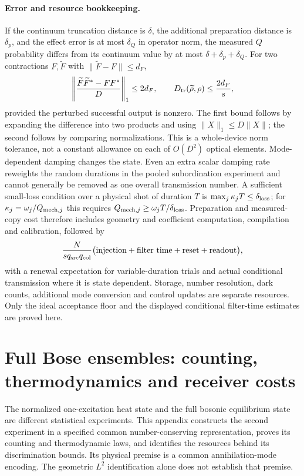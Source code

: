 \documentclass[aps,pra,reprint,superscriptaddress,longbibliography]{revtex4-2}
\begin{document}
\paragraph{Error and resource bookkeeping.}
If the continuum truncation distance is $\delta$, the additional
preparation distance is $\delta_p$, and the effect error is at most
$\delta_Q$ in operator norm, the measured $Q$ probability differs
from its continuum value by at most $\delta+\delta_p+\delta_Q$.
For two contractions $F,\widetilde F$ with
$\|\widetilde F-F\|\le d_F$,
\[
 \left\|\frac{\widetilde F\widetilde F^*-FF^*}{D}\right\|_1
 \le2d_F,
 \qquad D_{\rm tr}(\widetilde\rho,\rho)\le\frac{2d_F}{s},
\]
provided the perturbed successful output is nonzero. The first bound
follows by expanding the difference into two products and using
$\|X\|_1\le D\|X\|$; the second follows by comparing normalizations.
This is a whole-device norm tolerance, not a constant allowance on
each of $O(D^2)$ optical elements. Mode-dependent damping changes
the state. Even an extra scalar damping rate reweights the random
durations in the pooled subordination experiment and cannot generally
be removed as one overall transmission number. A sufficient small-loss
condition over a physical shot of duration $T$ is
$\max_j\kappa_jT\le\delta_{\rm loss}$; for
$\kappa_j=\omega_j/Q_{{\rm mech},j}$ this requires
$Q_{{\rm mech},j}\ge\omega_jT/\delta_{\rm loss}$.
Preparation and measured-copy cost therefore includes geometry and
coefficient computation, compilation and calibration, followed by
\[
 \frac{N}{s q_{\rm src}q_{\rm col}}
 \bigl(\text{injection}+
       \text{filter time}+\text{reset}+\text{readout}\bigr),
\]
with a renewal expectation for variable-duration trials and actual
conditional transmission where it is state dependent. Storage,
number resolution, dark counts, additional mode conversion and
control updates are separate resources. Only the ideal acceptance
floor and the displayed conditional filter-time estimates are proved
here.

\section{Full Bose ensembles: counting, thermodynamics and receiver costs}
\label{sgt:bose:appendix}

The normalized one-excitation heat state and the full bosonic equilibrium
state are different statistical experiments.  This appendix constructs the
second experiment in a specified common number-conserving representation,
proves its counting and thermodynamic laws, and identifies the resources
behind its discrimination bounds.  Its physical premise is a common
annihilation-mode encoding.  The geometric $L^2$ identification alone does
not establish that premise.
\end{document}
